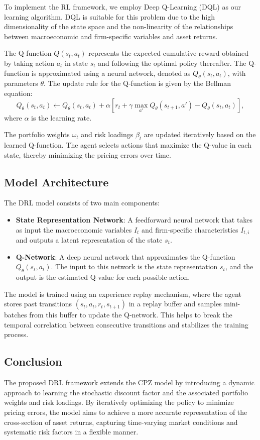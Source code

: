 To implement the RL framework, we employ Deep Q-Learning (DQL) as our learning algorithm. DQL is suitable for this problem due to the high dimensionality of the state space and the non-linearity of the relationships between macroeconomic and firm-specific variables and asset returns.

The Q-function $Q(s_t, a_t)$ represents the expected cumulative reward obtained by taking action $a_t$ in state $s_t$ and following the optimal policy thereafter. The Q-function is approximated using a neural network, denoted as $Q_\theta(s_t, a_t)$, with parameters $\theta$. The update rule for the Q-function is given by the Bellman equation:
\begin{equation}
    Q_\theta(s_t, a_t) \leftarrow Q_\theta(s_t, a_t) + \alpha \left[ r_t + \gamma \max_{a'} Q_\theta(s_{t+1}, a') - Q_\theta(s_t, a_t) \right],
\end{equation}
where $\alpha$ is the learning rate.

The portfolio weights $\omega_t$ and risk loadings $\beta_t$ are updated iteratively based on the learned Q-function. The agent selects actions that maximize the Q-value in each state, thereby minimizing the pricing errors over time.

\subsection{Model Architecture}

The DRL model consists of two main components:
\begin{itemize}
    \item \textbf{State Representation Network}: A feedforward neural network that takes as input the macroeconomic variables $I_t$ and firm-specific characteristics $I_{t,i}$ and outputs a latent representation of the state $s_t$.
    \item \textbf{Q-Network}: A deep neural network that approximates the Q-function $Q_\theta(s_t, a_t)$. The input to this network is the state representation $s_t$, and the output is the estimated Q-value for each possible action.
\end{itemize}

The model is trained using an experience replay mechanism, where the agent stores past transitions $(s_t, a_t, r_t, s_{t+1})$ in a replay buffer and samples mini-batches from this buffer to update the Q-network. This helps to break the temporal correlation between consecutive transitions and stabilizes the training process.

\subsection{Conclusion}

The proposed DRL framework extends the CPZ model by introducing a dynamic approach to learning the stochastic discount factor and the associated portfolio weights and risk loadings. By iteratively optimizing the policy to minimize pricing errors, the model aims to achieve a more accurate representation of the cross-section of asset returns, capturing time-varying market conditions and systematic risk factors in a flexible manner.